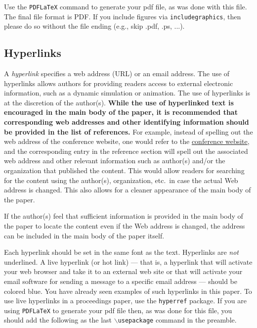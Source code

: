 \documentclass{wscpaperproc}
\theoremstyle{wsc}
\begin{document}
Use the {\tt PDFLaTeX} command to generate your pdf file, as was done with this file. 
The final file format is PDF.
If you include figures via {\tt includegraphics}, then please do so without the file ending (e.g., skip .pdf, .ps, ...).

\subsection{Hyperlinks}
\label{sec: hyper}
A {\em hyperlink} specifies a web address (URL) or an email address.
The use of hyperlinks allows authors for providing readers access to external electronic information, such as a dynamic simulation or animation.
The use of hyperlinks is at the discretion of the author(s).
{\bf While the use of hyperlinked text is encouraged in the main body of the paper, it is recommended that corresponding web addresses and other identifying information should be provided in the list of references.}
For example, instead of spelling out the web address of the conference website, one would refer to the  \href{http://www.wintersim.org}{conference website}, and the corresponding entry in the reference section will spell out the associated web address and other relevant information such as author(s) and/or the organization that published the content.
This would allow readers for searching for the content using the author(s), organization, etc.\ in case the actual Web address is changed.  This also allows for a cleaner appearance of the main body of the paper.

If the author(s) feel that sufficient information is provided in the main body of the paper to locate the content even if the Web address is changed, the address can be included in the main body of the paper itself.

Each hyperlink should be set in the same font as the text.
Hyperlinks are {\em not} underlined.
A live hyperlink (or hot link) --- that is, a hyperlink that will activate your web browser and take it to an external web site or that will activate your email software for sending a message to a specific email address --- should be colored blue. You have already seen examples of such hyperlinks in this paper.
To use live hyperlinks in a proceedings paper, use the {\tt hyperref} package. If you are using {\tt PDFLaTeX} to generate your pdf file then, as
was done for this file, you should add the following as the last {\tt $\backslash$usepackage} command in the preamble.\newline
\end{document}
